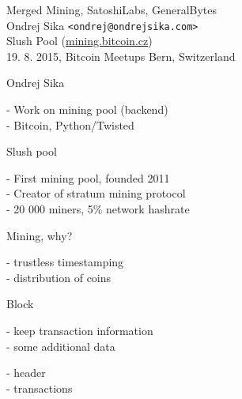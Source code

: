 \documentclass{beamer}
\begin{document}
\begin{frame}

    {\LARGE Merged Mining, SatoshiLabs, GeneralBytes}\\
    \vspace{7mm}
    {\Large Ondrej Sika \lstinline|<ondrej@ondrejsika.com>|}\\
    \vspace{7mm}
    {\large Slush Pool (\url{mining.bitcoin.cz})}\\
    \vspace{7mm}
    19. 8. 2015, Bitcoin Meetups Bern, Switzerland\\

\end{frame}

\begin{frame}

    {\LARGE Ondrej Sika}\\

    \vspace{5mm}

    - Work on mining pool (backend)\\
    - Bitcoin, Python/Twisted\\

    \vspace{10mm}

    {\LARGE Slush pool}\\

    \vspace{5mm}

    - First mining pool, founded 2011\\
    - Creator of stratum mining protocol\\
    - 20 000 miners, 5\% network hashrate\\

\end{frame}

\begin{frame}

    {\LARGE Mining, why?}\\

    \vspace{5mm}

    - trustless timestamping\\
    - distribution of coins\\

\end{frame}

\begin{frame}

    {\LARGE Block}\\

    \vspace{5mm}

    - keep transaction information\\
    - some additional data\\

    \vspace{5mm}

    - header\\
    - transactions\\

\end{frame}
\end{document}
